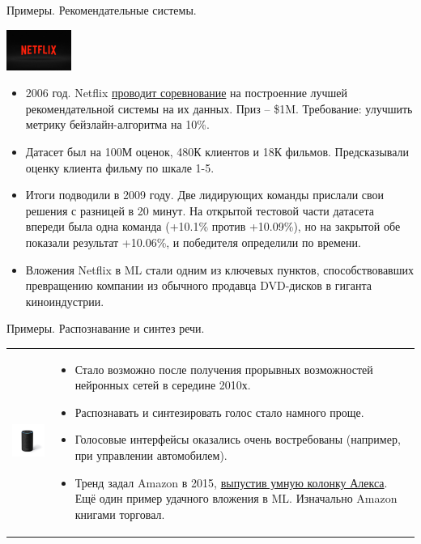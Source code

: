 \documentclass[9pt]{beamer}
\begin{document}
\begin{frame}{Примеры. Рекомендательные системы.}
\begin{center}\includegraphics[height=50px]{img/intro_netflix.jpg}\end{center}
\begin{itemize}
    \item 2006 год. Netflix \href{https://ru.wikipedia.org/wiki/Netflix_Prize}{проводит соревнование} на построенние лучшей рекомендательной системы на их данных. Приз -- \$1M. Требование: улучшить метрику бейзлайн-алгоритма на 10\%.
    \item Датасет был на 100М оценок, 480К клиентов и 18К фильмов. Предсказывали оценку клиента фильму по шкале 1-5.
    \item Итоги подводили в 2009 году. Две лидирующих команды прислали свои решения с разницей в 20 минут. На открытой тестовой части датасета впереди была одна команда (+10.1\% против +10.09\%), но на закрытой обе показали результат +10.06\%, и победителя определили по времени.
    \item Вложения Netflix в ML стали одним из ключевых пунктов, способствовавших превращению компании из обычного продавца DVD-дисков в гиганта киноиндустрии.
\end{itemize}
\end{frame}

\begin{frame}{Примеры. Распознавание и синтез речи.}
\begin{tabular}{m{}m{}}
\includegraphics[width=100px]{img/intro_amazon_echo.jpg} & 
\begin{itemize}
    \item Стало возможно после получения прорывных возможностей нейронных сетей в середине 2010х.
    \item Распознавать и синтезировать голос стало намного проще.
    \item Голосовые интерфейсы оказались очень востребованы (например, при управлении автомобилем).
    \item Тренд задал Amazon в 2015, \href{https://ru.wikipedia.org/wiki/Amazon_Echo}{выпустив умную колонку Алекса}. Ещё один пример удачного вложения в ML. Изначально Amazon книгами торговал.
\end{itemize}
\end{tabular}
\end{frame}
\end{document}
